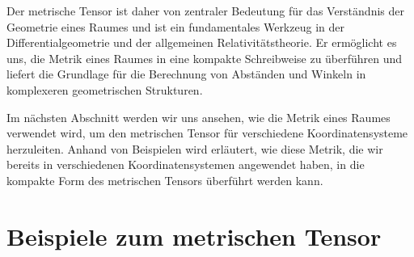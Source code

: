 Der metrische Tensor ist daher von zentraler Bedeutung für das Verständnis der Geometrie eines Raumes und ist ein fundamentales Werkzeug in der Differentialgeometrie und der allgemeinen Relativitätstheorie. 
Er ermöglicht es uns, die Metrik eines Raumes in eine kompakte Schreibweise zu überführen und liefert die Grundlage für die Berechnung von Abständen und Winkeln in komplexeren geometrischen Strukturen.

Im nächsten Abschnitt werden wir uns ansehen, wie die Metrik eines Raumes verwendet wird, um den metrischen Tensor für verschiedene Koordinatensysteme herzuleiten.
Anhand von Beispielen wird erläutert, wie diese Metrik, die wir bereits in verschiedenen Koordinatensystemen angewendet haben, in die kompakte Form des metrischen Tensors überführt werden kann.


\section{Beispiele zum metrischen Tensor}





